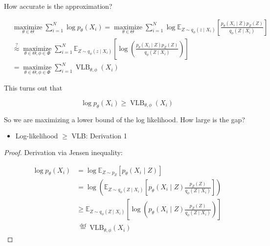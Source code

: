 \documentclass{report}
\begin{document}
\begin{concept}
    How accurate is the approximation?

    $$
    \begin{aligned}
    & \underset{\theta \in \Theta}{\operatorname{maximize}} \sum_{i=1}^{N} \log p_{\theta}\left(X_{i}\right)=\underset{\theta \in \Theta}{\operatorname{maximize}} \sum_{i=1}^{N} \log \mathbb{E}_{Z \sim q_{\phi}\left(z \mid X_{i}\right)}\left[\frac{p_{\theta}\left(X_{i} \mid Z\right) p_{Z}(Z)}{q_{\phi}\left(Z \mid X_{i}\right)}\right] \\
    & \stackrel{?}{\approx} \underset{\theta \in \Theta, \phi \in \Phi}{\operatorname{maximize}} \sum_{i=1}^{N} \mathbb{E}_{Z \sim q_{\phi}\left(z \mid X_{i}\right)}\left[\log \left(\frac{p_{\theta}\left(X_{i} \mid Z\right) p_{Z}(Z)}{q_{\phi}\left(Z \mid X_{i}\right)}\right)\right] \\
    &=\underset{\theta \in \Theta, \phi \in \Phi}{\operatorname{maximize}} \sum_{i=1}^{N} \operatorname{VLB}_{\theta, \phi}\left(X_{i}\right)
    \end{aligned}
    $$

    This turns out that 

    $$
    \log p_{\theta}\left(X_{i}\right) \geq \operatorname{VLB}_{\theta, \phi}\left(X_{i}\right)
    $$

    So we are maximizing a lower bound of the log likelihood. How large is the gap?

    \par\noindent\textcolor{gray}{\hdashrule{\textwidth}{0.4pt}{1pt 2pt}}

    \begin{itemize}
        \item Log-likelihood $\geq$ VLB: Derivation 1
    \end{itemize}

    \begin{proof}
        Derivation via Jensen inequality:

        $$
        \begin{aligned}
        \log p_{\theta}\left(X_{i}\right) & =\log \mathbb{E}_{Z \sim p_{Z}}\left[p_{\theta}\left(X_{i} \mid Z\right)\right] \\
        & =\log \left(\mathbb{E}_{Z \sim q_{\phi}\left(Z \mid X_{i}\right)}\left[p_{\theta}\left(X_{i} \mid Z\right) \frac{p_{Z}(Z)}{q_{\phi}\left(Z \mid X_{i}\right)}\right]\right) \\
        & \geq \mathbb{E}_{Z \sim q_{\phi}\left(Z \mid X_{i}\right)}\left[\log \left(p_{\theta}\left(X_{i} \mid Z\right) \frac{p_{Z}(Z)}{q_{\phi}\left(Z \mid X_{i}\right)}\right)\right] \\
        & \stackrel{\text { def }}{=} \mathrm{VLB}_{\theta, \phi}\left(X_{i}\right)
        \end{aligned}
        $$
    \end{proof}


\end{concept}
\end{document}
